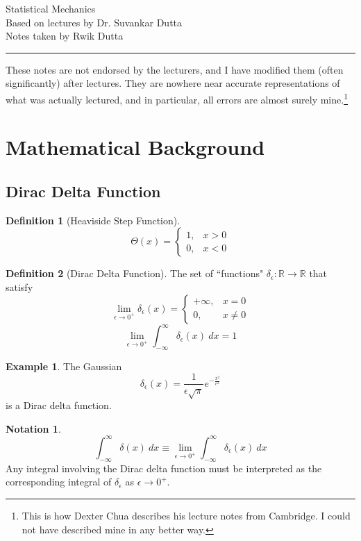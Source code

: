 \documentclass[10pt, a4paper]{extarticle}
\theoremstyle{definition}
\newtheorem{defn}{Definition}
\newtheorem{eg}{Example}
\newtheorem{notation}{Notation}
\begin{document}
\begin{center}
	\fontsize{25}{60}\selectfont Statistical Mechanics \\
	\large Based on lectures by Dr. Suvankar Dutta\\
	Notes taken by Rwik Dutta
\end{center}
\hrule
\begin{center}
	These notes are not endorsed by the lecturers, and I have modified them (often
	significantly) after lectures. They are nowhere near accurate representations of what
	was actually lectured, and in particular, all errors are almost surely mine.\footnote[1]{This is how Dexter Chua describes his lecture notes from Cambridge. I could not have described mine in any better way.}
\end{center}
\tableofcontents

\newpage

\section{Mathematical Background}
\subsection{Dirac Delta Function}
\begin{defn}[Heaviside Step Function]
	\[\Theta(x)=\begin{cases}
			1, & x>0 \\
			0, & x<0
		\end{cases}\]
\end{defn}

\begin{defn}[Dirac Delta Function]
	The set of ``functions" $\delta_\epsilon:\mathbb{R}\to\mathbb{R}$ that satisfy
	\[\lim_{\epsilon\to 0^+}\delta_\epsilon(x)=\begin{cases}
		+\infty,&x=0\\
		0,&x\neq 0
	\end{cases}\]
	\[\lim_{\epsilon\to0^+}\int_{-\infty}^{\infty}\delta_\epsilon(x)\ dx=1\]
\end{defn}

\begin{eg}
	The Gaussian \[\delta_\epsilon(x)=\frac{1}{\epsilon\sqrt{\pi}}e^{-\frac{x^2}{\epsilon^2}}\] is a Dirac delta function.
\end{eg}

\begin{notation}
	\[\int_{-\infty}^{\infty}\delta(x)\ dx\equiv \lim_{\epsilon\to0^+}\int_{-\infty}^{\infty}\delta_\epsilon(x)\ dx\]
	Any integral involving the Dirac delta function must be interpreted as the corresponding integral of $\delta_\epsilon$ as $\epsilon\to 0^+$.
\end{notation}
\end{document}

